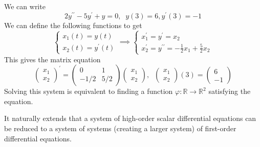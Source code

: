 \documentclass{article}
\newcounter{example}[section]
\begin{document}
    \begin{example}
      \label{ex:shifting-an-initial-condition-to-the-origin}
    We can write 
    \begin{equation}
      2 y^{\prime\prime} - 5 y^\prime + y = 0, \;\; y(3) = 6, y^\prime (3) = -1
    \end{equation}
    We can define the following functions to get
    \begin{equation}
      \begin{cases}
              x_1 (t) = y(t) \\
              x_2 (t) = y^\prime (t)
          \end{cases} \implies \begin{cases}
          x_1^\prime = y^\prime = x_2 \\
          x_2^\prime = y^{\prime\prime} = -\frac{1}{2} x_1 + \frac{5}{2} x_2
          \end{cases}
    \end{equation}
    This gives the matrix equation
    \begin{equation}
      \begin{pmatrix}
          x_1 \\ x_2
          \end{pmatrix}^\prime = \begin{pmatrix}
          0 & 1 \\ -1/2 & 5/2
          \end{pmatrix} \begin{pmatrix}
          x_1 \\ x_2
          \end{pmatrix}, \;\; \begin{pmatrix} x_1 \\ x_2 \end{pmatrix} (3) = \begin{pmatrix} 6 \\ -1 \end{pmatrix}
    \end{equation}
    Solving this system is equivalent to finding a function $\varphi: \mathbb{R} \to \mathbb{R}^2$ satisfying the equation. 
    \end{example}  

    It naturally extends that a system of high-order scalar differential equations can be reduced to a system of systems (creating a larger system) of first-order differential equations. 
\end{document}
